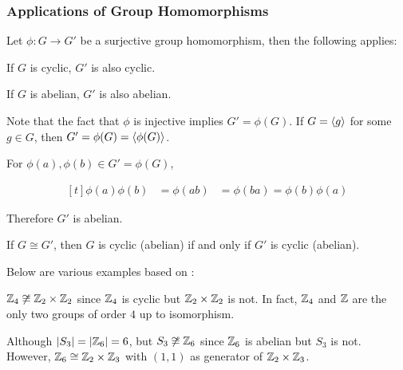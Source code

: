\documentclass[a4paper,12pt]{article}
\begin{document}
\subsubsection{Applications of Group Homomorphisms}
\begin{pst}
  Let $\phi:G\to G'$ be a surjective group homomorphism, then the following applies:

  \begin{alist}
    \item If $G$ is cyclic, $G'$ is also cyclic.
    \item If $G$ is abelian, $G'$ is also abelian.
  \end{alist}

  \prf {} Note that the fact that $\phi$ is injective implies $G'=\phi(G)$. If $G=\left\langle g\right\rangle$ for some $g\in G$, then $G'=\phi(G)=\left\langle \phi(G)\right\rangle$.\n

   For $\phi(a),\phi(b)\in G'=\phi(G)$,

  $$\begin{aligned}[t]
    \phi(a)\phi(b)&=\phi(ab)
    &=\phi(ba)=\phi(b)\phi(a)
  \end{aligned}$$\s

  Therefore $G'$ is abelian.
\end{pst}\n

\begin{crl}
  If $G\cong G'$, then $G$ is cyclic (abelian) if and only if $G'$ is cyclic (abelian).
\end{crl}\n

\begin{exm}
  Below are various examples based on \rpst[\sctd{1}]:

  \begin{alist}
    \item $\mathbb{Z}_{4}\not\cong\mathbb{Z}_{2}\times\mathbb{Z}_{2}$ since $\mathbb{Z}_{4}$ is cyclic but $\mathbb{Z}_{2}\times\mathbb{Z}_{2}$ is not. In fact, $\mathbb{Z}_{4}$ and $\mathbb{Z}$ are the only two groups of order $4$ up to isomorphism.
    \item Although $\left| S_{3}\right|=\left| \mathbb{Z}_{6}\right|=6$, but $S_{3}\not\cong\mathbb{Z}_{6}$ since $\mathbb{Z}_{6}$ is abelian but $S_{3}$ is not. However, $\mathbb{Z}_{6}\cong\mathbb{Z}_{2}\times\mathbb{Z}_{3}$ with $(1,1)$ as generator of $\mathbb{Z}_{2}\times\mathbb{Z}_{3}$.
  \end{alist}
\end{exm}
\end{document}
